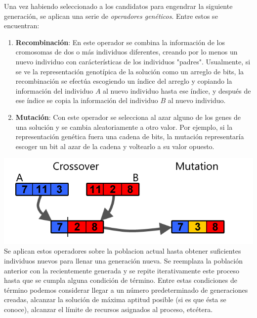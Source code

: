 \documentclass{article}
\begin{document}
  Una vez habiendo seleccionado a los candidatos para engendrar la siguiente generación, se aplican una serie de 
  \textit{operadores genéticos}. Entre estos se encuentran: 
  \begin{enumerate}
    \item \textbf{Recombinación}: En este operador se combina la información de los cromosomas de dos o más
      individuos diferentes, creando por lo menos un nuevo individuo con carácterísticas de los individuos "padres".
      Usualmente, si se ve la representación genotípica de la solución como un arreglo de bits, la recombinación
      se efectúa escogiendo un índice del arreglo y copiando la información del individuo $A$ al nuevo individuo
      hasta ese índice, y después de ese índice se copia la información del individuo $B$ al nuevo individuo.

    \item \textbf{Mutación}: Con este operador se selecciona al azar alguno de los genes de una solución y se cambia
      aleatoriamente a otro valor. Por ejemplo, si la representación genética fuera una cadena de bits, la mutación
      representaría escoger un bit al azar de la cadena y voltearlo a su valor opuesto.
  \end{enumerate}
  \includegraphics[width=\textwidth]{crossover_mutation}
  Se aplican estos operadores sobre la poblacion actual hasta obtener suficientes individuos nuevos para llenar 
  una generación nueva. Se reemplaza la población anterior con la recientemente generada y se repite iterativamente este
  proceso hasta que se cumpla alguna condición de término. Entre estas condiciones de término podemos considerar llegar a
  un número predeterminado de generaciones creadas, alcanzar la solución de máxima aptitud posible (si es que ésta se 
  conoce), alcanzar el límite de recursos asignados al proceso, etcétera.
\end{document}
